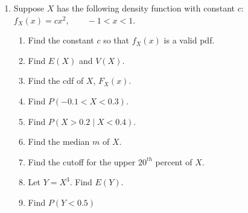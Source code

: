 \documentclass{article}
\begin{document}
\begin{enumerate}
        \item Suppose $X$ has the following density function with constant $c$: $f_X(x) = cx^2, \quad\quad -1 < x < 1$.
    \begin{enumerate}
        \item Find the constant $c$ so that $f_X(x)$ is a valid pdf.\vspace{150pt}
        \item Find $E(X)$ and $V(X)$.\vspace{150pt}
        \item Find the cdf of $X$, $F_X(x)$.\vspace{150pt}
        \item Find $P( -0.1 < X < 0.3)$.\vspace{80pt}
        \item Find $P(X > 0.2 \mid X< 0.4)$.\vspace{100pt}
        \item Find the median $m$ of $X$.\vspace{100pt}
        \item Find the cutoff for the upper $20^{th}$ percent of $X$.\vspace{80pt}
        \item Let $Y = X^3$. Find $E(Y)$.\vspace{130pt}
        \item Find $P(Y < 0.5)$\vspace{130pt}
    \end{enumerate}\bigskip
    
\end{enumerate}
\end{document}
